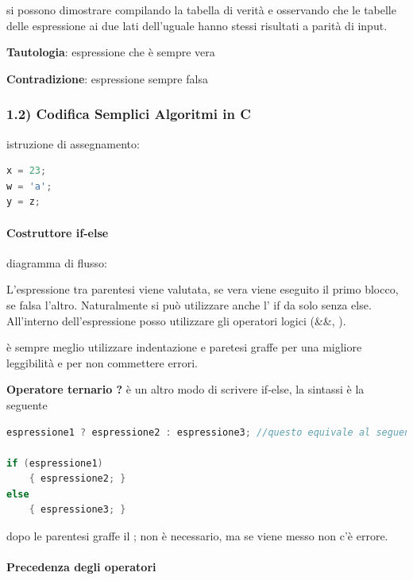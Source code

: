\documentclass[
  paper=a4,
  oneside  ,captions=tableheading
]{scrbook}
\begin{document}
si possono dimostrare compilando la tabella di verità e osservando che
le tabelle delle espressione ai due lati dell'uguale hanno stessi
risultati a parità di input.

\textbf{Tautologia}: espressione che è sempre vera

\textbf{Contradizione}: espressione sempre falsa

\hypertarget{codifica-semplici-algoritmi-in-c}{%
\subsubsection{1.2) Codifica Semplici Algoritmi in
C}\label{codifica-semplici-algoritmi-in-c}}

istruzione di assegnamento:

\begin{lstlisting}[language={C++}]
x = 23;
w = 'a';
y = z;
\end{lstlisting}

\hypertarget{costruttore-if-else}{%
\paragraph{Costruttore if-else}\label{costruttore-if-else}}

diagramma di flusso:

L'espressione tra parentesi viene valutata, se vera viene eseguito il
primo blocco, se falsa l'altro. Naturalmente si può utilizzare anche l'
if da solo senza else. All'interno dell'espressione posso utilizzare gli
operatori logici (\&\&, \textbar\textbar).

è sempre meglio utilizzare indentazione e paretesi graffe per una
migliore leggibilità e per non commettere errori.

\textbf{Operatore ternario ?} è un altro modo di scrivere if-else, la
sintassi è la seguente

\begin{lstlisting}[language={C++}]
espressione1 ? espressione2 : espressione3; //questo equivale al seguente if-else

if (espressione1)
    { espressione2; }
else
    { espressione3; }
\end{lstlisting}

dopo le parentesi graffe il ; non è necessario, ma se viene messo non
c'è errore.

\hypertarget{precedenza-degli-operatori}{%
\paragraph{Precedenza degli
operatori}\label{precedenza-degli-operatori}}
\end{document}
